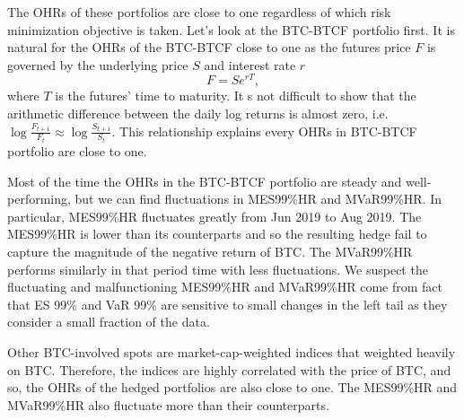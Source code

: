 The OHRs of these portfolios are close to one regardless of which risk minimization objective is taken.
Let's look at the BTC-BTCF portfolio first.
It is natural for the OHRs of the BTC-BTCF close to one as the futures price $F$ is governed by the underlying price $S$ and interest rate $r$
$$F = Se^{rT},$$
where $T$ is the futures' time to maturity.
It s not difficult to show that the arithmetic difference between the daily log returns is almost zero, i.e. $\log\frac{F_{t+1}}{F_t} \approx \log\frac{S_{t+1}}{S_t}$.
This relationship explains every OHRs in BTC-BTCF portfolio are close to one. 




Most of the time the OHRs in the BTC-BTCF portfolio are steady and well-performing,
but we can find fluctuations in MES99\%HR and MVaR99\%HR. 
In particular, MES99\%HR fluctuates greatly from Jun 2019 to Aug 2019.
The MES99\%HR is lower than its counterparts and so the resulting hedge fail to capture the magnitude of the negative return of BTC.
The MVaR99\%HR performs similarly in that period time with less fluctuations.
We suspect the fluctuating and malfunctioning MES99\%HR and MVaR99\%HR come from fact that ES 99\% and VaR 99\% are sensitive to small changes in the left tail as they consider a small fraction
of the data. \medskip

Other BTC-involved spots are market-cap-weighted indices that weighted heavily on BTC.
Therefore, the indices are highly correlated with the price of BTC, and so, the OHRs of the hedged portfolios are also close to one.
The MES99\%HR and MVaR99\%HR also fluctuate more than their counterparts. \medskip

